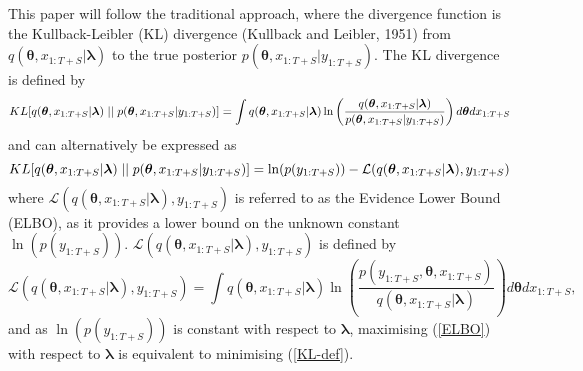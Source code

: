 \documentclass[12pt,a4paper]{article}%
\numberwithin{equation}{section}
\begin{document}
{{This paper will follow the traditional approach, where the divergence function is the Kullback-Leibler (KL) divergence (Kullback and Leibler, 1951) from $q(\boldsymbol{\theta}, x_{1:T+S}| \boldsymbol{\lambda})$ to the true posterior $p(\boldsymbol{\theta}, x_{1:T+S} | y_{1:T+S})$. The KL divergence is defined by
\begin{equation}
\label{KL-def}
KL[q(\boldsymbol{\theta}, x_{1:T+S}| \boldsymbol{\lambda})\hspace{.1cm}||\hspace{.1cm}p(\boldsymbol{\theta}, x_{1:T+S} | y_{1:T+S})] = \int q(\boldsymbol{\theta}, x_{1:T+S} | \boldsymbol{\lambda}) \ln \left( \frac{q(\boldsymbol{\theta}, x_{1:T+S} | \boldsymbol{\lambda})}{p(\boldsymbol{\theta}, x_{1:T+S} |y_{1:T+S})}\right) d\boldsymbol{\theta} dx_{1:T+S}
\end{equation}
and can alternatively be expressed as
\begin{equation}
\label{KL-ELBO}
KL[q(\boldsymbol{\theta}, x_{1:T+S} | \boldsymbol{\lambda})\hspace{.1cm}||\hspace{.1cm}p(\boldsymbol{\theta}, x_{1:T+S} | y_{1:T+S})] = \ln(p(y_{1:T+S})) - \mathcal{L}(q(\boldsymbol{\theta}, x_{1:T+S} | \boldsymbol{\lambda}), y_{1:T+S})
\end{equation}
where $\mathcal{L}(q(\boldsymbol{\theta}, x_{1:T+S} | \boldsymbol{\lambda}), y_{1:T+S})$ is referred to as the Evidence Lower Bound (ELBO), as it provides a lower bound on the unknown constant $\ln(p(y_{1:T+S}))$.  $\mathcal{L}(q(\boldsymbol{\theta}, x_{1:T+S} | \boldsymbol{\lambda}), y_{1:T+S})$ is defined by
\begin{equation}
\label{ELBO}
\mathcal{L}(q(\boldsymbol{\theta}, x_{1:T+S} | \boldsymbol{\lambda}), y_{1:T+S}) = \int q(\boldsymbol{\theta}, x_{1:T+S} | \boldsymbol{\lambda}) \ln \left( \frac{p(y_{1:T+S},\boldsymbol{\theta}, x_{1:T+S})}{q(\boldsymbol{\theta}, x_{1:T+S} | \boldsymbol{\lambda})} \right) d\boldsymbol{\theta}dx_{1:T+S},
\end{equation}
and as $\ln(p(y_{1:T+S}))$ is constant with respect to $\boldsymbol{\lambda}$, maximising (\ref{ELBO}) with respect to $\boldsymbol{\lambda}$ is equivalent to minimising (\ref{KL-def}). 

}}
\end{document}
